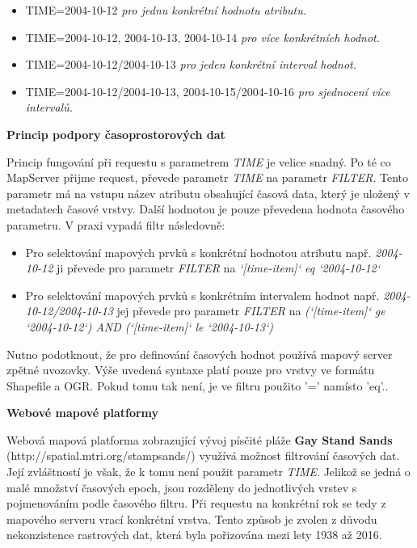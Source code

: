 \begin{itemize}
\item TIME=2004-10-12 \textit{pro jednu konkrétní hodnotu atributu.}
\item TIME=2004-10-12, 2004-10-13, 2004-10-14 \textit{pro více
    konkrétních hodnot.}
\item TIME=2004-10-12/2004-10-13 \textit{pro jeden konkrétní interval
    hodnot.}
\item TIME=2004-10-12/2004-10-13, 2004-10-15/2004-10-16 \textit{pro
    sjednocení více intervalů.}
\end{itemize}

\bigskip
\noindent
\textbf{Princip podpory časoprostorových dat}

Princip fungování při requestu s parametrem \textit{TIME} je velice
snadný. Po té co MapServer přijme request, převede parametr
\textit{TIME} na parametr \textit{FILTER}. Tento parametr má na vstupu
název atributu obsahující časová data, který je uložený v metadatech
časové vrstvy\cite{mapserver_about}. Další hodnotou je pouze převedena
hodnota časového parametru. V praxi vypadá filtr následovně:

\bigskip
\begin{itemize}
	\item Pro selektování mapových prvků s konkrétní hodnotou
atributu např. \textit{2004-10-12} ji převede pro parametr
\textit{FILTER} na \textit{`[time-item]` eq `2004-10-12`}
	\item Pro selektování mapových prvků s konkrétním intervalem
hodnot např. \textit{2004-10-12/2004-10-13} jej převede pro parametr
\textit{FILTER} na \textit{(`[time-item]` ge `2004-10-12`) AND
(`[time-item]` le `2004-10-13`)}
\end{itemize}

\bigskip Nutno podotknout, že pro definování časových hodnot používá
mapový server zpětné uvozovky. Výše uvedená syntaxe platí pouze pro
vrstvy ve formátu Shapefile a OGR. Pokud tomu tak není, je ve filtru
použito '=' namísto 'eq'.\cite{mapserver_about}.

\bigskip
\noindent \textbf{Webové mapové platformy}

Webová mapová platforma zobrazující vývoj písčité pláže \textbf{Gay
Stand Sands} (http://spatial.mtri.org/stampsands/) využívá možnost
filtrování časových dat. Její zvláštností je však, že k tomu není
použit parametr \textit{TIME}. Jelikož se jedná o malé množství
časových epoch, jsou rozděleny do jednotlivých vrstev s pojmenováním
podle časového filtru. Při requestu na konkrétní rok se tedy z
mapového serveru vrací konkrétní vrstva. Tento způsob je zvolen z
důvodu nekonzistence rastrových dat, která byla pořizována mezi lety
1938 až 2016.


